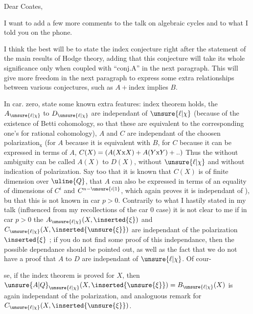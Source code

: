 Dear Coates,

I want to add a few more comments to the talk on algebraic cycles and to what I told you on the phone.

I think the best will be to state the index conjecture right after the statement of the main results of Hodge theory, adding that this conjecture will take its whole significance only when coupled with ``conj.A'' in the next paragraph. This will give more freedom in the next paragraph to express some extra relationships between various conjectures, such as $A+\text{index}$ implies $B$.

In car. zero, state some known extra features: index theorem holds, the  $A_{\unsure{\ell|\chi}}$ to $D_{\unsure{\ell|\chi}}$ are independant of $\unsure{\ell|\chi}$ (because of the existence of Betti cohomology, so that these  are equivalent to the corresponding one's for rational cohomology),  $A$ and $C$ are independant of the choosen polarization$_{\mathrm{x}}$ (for $A$ because it is equivalent with $B$, for $C$ because it can be expressed in terms of $A$, $C(X)=(A(X\mathrm{x}X)+A(Y\mathrm{x}Y)+\mathinner{..})$ Thus the  without ambiguity can be called $A(X)$ to $D(X)$, without  $\unsure{\ell|\chi}$ and without indication of polarization. Say too that it is known that $C(X)$ is of finite dimension over $\uline{Q}$, \inserted{(} that $A$ can also be expressed in terms of an equality of dimensions of $C^i$ and $C^{n-\unsure{i|1}}$\deleted{)}, which again proves it is independant of \hspace{1em}), bu that this is not known in car $p>0$. Contrarily to what I hastily stated in my talk (influenced from my recollections of the car $0$ case) it is not clear to me if in car $p>0$ the   $A_{\unsure{\ell|\chi}}(X,\inserted{\xi})$ and $C_{\unsure{\ell|\chi}}(X,\inserted{\unsure{\xi}})$ are independant of the polarization $\inserted{\xi}$ ; if you do not find some proof of this independance, then the possible dependance should be pointed out, as well as the fact that  we do not have a proof that $A$ to $D$ are independant of $\unsure{\ell|\chi}$. Of cour-

se, if the index theorem is proved for $X$, then $\unsure{A|Q}_{\unsure{\ell|\chi}}(X,\inserted{\unsure{\xi}})=B_{\unsure{\ell|\chi}}(X)$ is again independant of the polarization, and analoguous remark for $C_{\unsure{\ell|\chi}}(X,\inserted{\unsure{\xi}})$.

